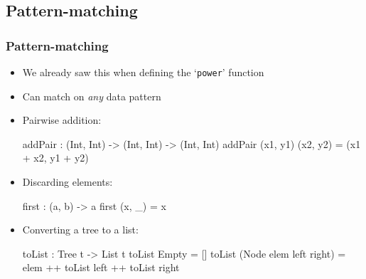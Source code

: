 \documentclass{beamer}
\begin{document}
  \subsection{Pattern-matching}
  \begin{frame}[fragile]
    \frametitle{Pattern-matching}

    \begin{itemize}
      \item We already saw this when defining the `\texttt{power}' function
      \item Can match on \textit{any} data pattern
      \item Pairwise addition:
            \vspace*{-6mm}
            \begin{idrislisting}
addPair : (Int, Int) -> (Int, Int) -> (Int, Int)
addPair (x1, y1) (x2, y2) = (x1 + x2, y1 + y2)
            \end{idrislisting}
      \vspace*{-2mm}
      \item Discarding elements:
            \vspace*{-6mm}
            \begin{idrislisting}
first : (a, b) -> a
first (x, _) = x
            \end{idrislisting}
      \vspace*{-2mm}
      \item Converting a tree to a list:
            \vspace*{-6mm}
            \begin{idrislisting}
toList : Tree t -> List t
toList Empty = []
toList (Node elem left right) =
  elem ++ toList left ++ toList right
            \end{idrislisting}
    \end{itemize}
  \end{frame}
\end{document}
